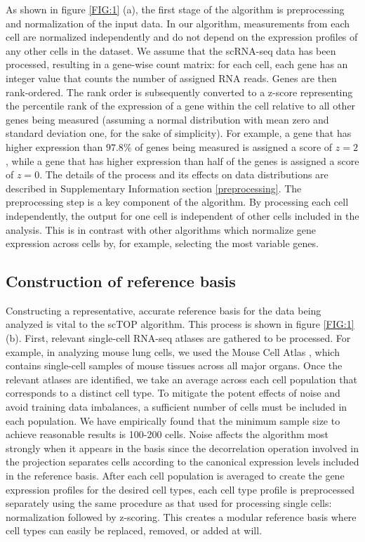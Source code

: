 \documentclass[vruler,JEB]{COB}%
\begin{document}
As shown in figure \ref{FIG:1} (a), the first stage of the algorithm is preprocessing and normalization of the input data. In our algorithm, measurements from each cell are normalized independently and do not depend on the expression profiles of any other cells in the dataset. We assume that the scRNA-seq data has been processed, resulting in a gene-wise count matrix: for each cell, each gene has an integer value that counts the number of assigned RNA reads. Genes are then rank-ordered. The rank order is subsequently converted to a z-score representing the percentile rank of the expression of a gene within the cell relative to all other genes being measured (assuming a normal distribution with mean zero and standard deviation one, for the sake of simplicity). For example, a gene that has higher expression than $97.8\%$ of genes being measured is assigned a score of $z=2$, while a gene that has higher expression than half of the genes is assigned a score of $z=0$. The details of the process and its effects on data distributions are described in Supplementary Information section \ref{preprocessing}. The preprocessing step is a key component of the algorithm. By processing each cell independently, the output for one cell is independent of other cells included in the analysis. This is in contrast with other algorithms which normalize gene expression across cells by, for example, selecting the most variable genes.


\subsection{Construction of reference basis}

Constructing a representative, accurate reference basis for the data being analyzed is vital to the scTOP algorithm. This process is shown in figure \ref{FIG:1} (b). First, relevant single-cell RNA-seq atlases are gathered to be processed. For example, in analyzing mouse lung cells, we used the Mouse Cell Atlas \citep{han2018mapping}, which contains single-cell samples of mouse tissues across all major organs. Once the relevant atlases are identified, we take an average across each cell population that corresponds to a distinct cell type. To mitigate the potent effects of noise and avoid training data imbalances, a sufficient number of cells must be included in each population. We have empirically found that the minimum sample size to achieve reasonable results is 100-200 cells. Noise affects the algorithm most strongly when it appears in the basis since the decorrelation operation involved in the projection separates cells according to the canonical expression levels included in the reference basis. After each cell population is averaged to create the gene expression profiles for the desired cell types, each cell type profile is preprocessed separately using the same procedure as that used for processing single cells: normalization followed by z-scoring. This creates a modular reference basis where cell types can easily be replaced, removed, or added at will. 
\end{document}
